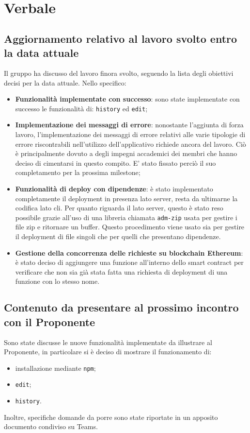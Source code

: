 \section{Verbale}

	\subsection{Aggiornamento relativo al lavoro svolto entro la data attuale}
	Il gruppo ha discusso del lavoro finora svolto, seguendo la lista degli obiettivi decisi per la data attuale. Nello specifico:
	\begin{itemize}
		\item \textbf{Funzionalità implementate con successo}: sono state implementate con successo le funzionalità di: \texttt{history} ed \texttt{edit}; 
		\item \textbf{Implementazione dei messaggi di errore}: nonostante l'aggiunta di forza lavoro, l'implementazione dei messaggi di errore relativi alle varie tipologie di errore riscontrabili nell'utilizzo dell'applicativo richiede ancora del lavoro. Ciò è principalmente dovuto a degli impegni accademici dei membri che hanno deciso di cimentarsi in questo compito. E' stato fissato perciò il suo completamento per la prossima milestone;
		\item \textbf{Funzionalità di deploy con dipendenze}: è stato implementato completamente il deployment in presenza lato server, resta da ultimarne la codifica lato cli. Per quanto riguarda il lato server, questo è stato reso possibile grazie all'uso di una libreria chiamata \texttt{adm-zip} usata per gestire i file zip e ritornare un buffer. Questo procedimento viene usato sia per gestire il deployment di file singoli che per quelli che presentano dipendenze.
		\item \textbf{Gestione della concorrenza delle richieste su blockchain Ethereum}: è stato deciso di aggiungere una funzione all'interno dello smart contract per verificare che non sia già stata fatta una richiesta di deployment di una funzione con lo stesso nome.
	\end{itemize}
	\subsection{Contenuto da presentare al prossimo incontro con il Proponente}
		Sono state discusse le nuove funzionalità implementate da illustrare al Proponente, in particolare si è deciso di mostrare il funzionamento di:
		\begin{itemize}
			\item installazione mediante \texttt{npm};
			\item \texttt{edit};
			\item \texttt{history}.
		\end{itemize}
Inoltre, specifiche domande da porre sono state riportate in un apposito documento condiviso su Teams.

